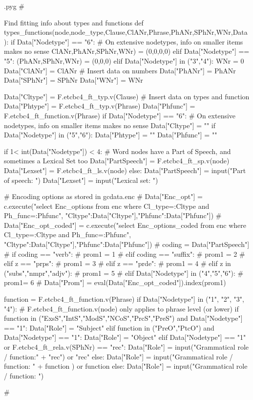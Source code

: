 \documentclass{report}
\makeatletter
\newenvironment{python}{%
  \VerbatimEnvironment
  \minted@resetoptions
  \setkeys{minted@opt}{}
      \begin{VerbatimOut}{\jobname.pyg}}
{%
      \end{VerbatimOut}
      \minted@pygmentize{python}
      \DeleteFile{\jobname.pyg}}
\makeatother
\begin{document}
\begin{python}
#{{{ Find fitting info about types and functions
def types_functions(node,node_type,Clause,ClANr,Phrase,PhANr,SPhNr,WNr,Data):
        if Data["Nodetype"] == "6":                # On extensive nodetypes, info on smaller items makes no sense
            ClANr,PhANr,SPhNr,WNr) = (0,0,0,0)
        elif Data["Nodetype"] == "5":
            (PhANr,SPhNr,WNr) = (0,0,0)
        elif Data["Nodetype"] in ("3","4"):
            WNr = 0
        Data["ClANr"] = ClANr                      # Insert data on numbers
        Data["PhANr"] = PhANr
        Data["SPhNr"] = SPhNr
        Data["WNr"] = WNr

        Data["Cltype"] = F.etcbc4_ft_typ.v(Clause) # Insert data on types and function
        Data["Phtype"] = F.etcbc4_ft_typ.v(Phrase)
        Data["Phfunc"] = F.etcbc4_ft_function.v(Phrase)
        if Data["Nodetype"] == "6":                # On extensive nodetypes, info on smaller items makes no sense
            Data["Cltype"] = ""
        if Data["Nodetype"] in ("5","6"):
            Data["Phtype"] = ""
            Data["Phfunc"] = ""

        if 1< int(Data["Nodetype"]) < 4:           # Word nodes have a Part of Speech, and sometimes a Lexical Set too
            Data["PartSpeech"] = F.etcbc4_ft_sp.v(node)
            Data["Lexset"] = F.etcbc4_ft_ls.v(node)
        else:
            Data["PartSpeech"] = input("Part of speech: ")
            Data["Lexset"] = input("Lexical set: ")

        # Encoding options as stored in gcdata.enc
#        Data["Enc_opt"] = c.execute("select Enc_options from enc where Cl_type=:Cltype and Ph_func=:Phfunc", {"Cltype":Data["Cltype"],"Phfunc":Data["Phfunc"]})
#        Data["Enc_opt_coded"] = c.execute("select Enc_options_coded from enc where Cl_type=:Cltype and Ph_func=:Phfunc", {"Cltype":Data["Cltype"],"Phfunc":Data["Phfunc"]})
#        coding = Data["PartSpeech"]
#        if coding == "verb":
#            prom1 = 1
#        elif coding == "suffix":
#            prom1 = 2
#        elif z == "prps":
#            prom1 = 3
#        elif z == "prde":
#            prom1 = 4
#        elif z in ("subs","nmpr","adjv"):
#            prom1 = 5
#        elif Data["Nodetype"] in ("4","5","6"):
#            prom1= 6
#        Data["Prom"] = eval(Data["Enc_opt_coded"]).index(prom1)

        function = F.etcbc4_ft_function.v(Phrase)
        if Data["Nodetype"] in ("1", "2", "3", "4"):    # F.etcbc4_ft_function.v(node) only applies to phrase level (or lower)
            if function in ("ExsS","IntS","ModS","NCoS","PrcS","PreS") and Data["Nodetype"] == "1":
                Data["Role"] = "Subject"
            elif function in ("PreO","PtcO") and Data["Nodetype"] == "1":
                Data["Role"] = "Object"
            elif Data["Nodetype"] == "1" or F.etcbc4_ft_rela.v(SPhNr) == "rec":
                Data["Role"] = input("Grammatical role / function:" + "rec") or "rec"
            else:
                Data["Role"] = input("Grammatical role / function: " + function ) or function
        else:
            Data["Role"] = input("Grammatical role / function: ")

#}}}
\end{python}
\end{document}
